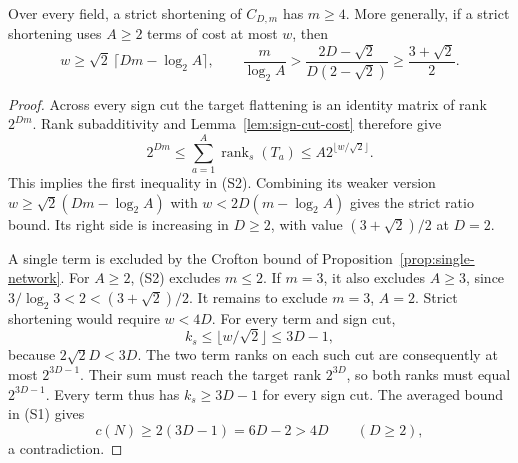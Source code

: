 \begin{proposition}
\label{prop:no-small-width-shortening}
Over every field, a strict shortening of $C_{D,m}$ has $m\ge4$.
More generally, if a strict shortening uses $A\ge2$ terms of
cost at most $w$, then
\[
 w\ge\sqrt2\,\big\lceil Dm-\log_2 A\big\rceil,
 \qquad
 \frac{m}{\log_2 A}>
 \frac{2D-\sqrt2}{D(2-\sqrt2)}
 \ge\frac{3+\sqrt2}{2}.                              \tag{S2}
\]
\end{proposition}
\begin{proof}
Across every sign cut the target flattening is an identity
matrix of rank $2^{Dm}$.  Rank subadditivity and
Lemma~\ref{lem:sign-cut-cost} therefore give
\[
 2^{Dm}\le\sum_{a=1}^A\operatorname{rank}_s(T_a)
 \le A2^{\lfloor w/\sqrt2\rfloor}.
\]
This implies the first inequality in (S2).  Combining its
weaker version $w\ge\sqrt2(Dm-\log_2 A)$ with
$w<2D(m-\log_2 A)$ gives the strict ratio bound.
Its right side is increasing in $D\ge2$, with value
$(3+\sqrt2)/2$ at $D=2$.

A single term is excluded by the Crofton bound
of Proposition~\ref{prop:single-network}.
For $A\ge2$, (S2) excludes $m\le2$.  If $m=3$,
it also excludes $A\ge3$, since
$3/\log_2 3<2<(3+\sqrt2)/2$.
It remains to exclude $m=3$, $A=2$.  Strict shortening
would require $w<4D$.  For every term and sign cut,
\[
 k_s\le\lfloor w/\sqrt2\rfloor\le3D-1,
\]
because $2\sqrt2D<3D$.  The two term ranks on each such
cut are consequently at most $2^{3D-1}$.  Their sum must
reach the target rank $2^{3D}$, so both ranks must equal
$2^{3D-1}$.  Every term thus has $k_s\ge3D-1$ for every
sign cut.  The averaged bound in (S1) gives
\[
 c(N)\ge2(3D-1)=6D-2>4D\qquad(D\ge2),
\]
a contradiction.
\end{proof}

